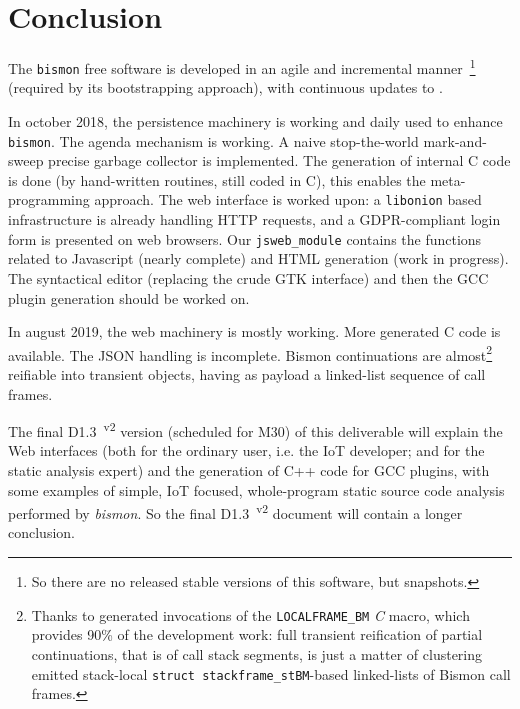 \section{Conclusion}
\label{sec:conclusion}

The \texttt{bismon} free software is developed in an agile and
incremental manner~\footnote{So there are no released stable versions
  of this software, but snapshots.} (required by its bootstrapping
approach), with continuous updates to
.

In october 2018, the persistence machinery is working and daily used
to enhance \texttt{bismon}. The agenda mechanism is working. A naive
stop-the-world mark-and-sweep precise garbage collector is
implemented. The generation of internal C code is done (by
hand-written routines, still coded in C), this enables the
meta-programming approach. The web interface is worked upon: a
\texttt{libonion} based infrastructure is already handling HTTP
requests, and a GDPR-compliant login form is presented on web
browsers. Our \texttt{jsweb\_module} contains the functions related to
Javascript (nearly complete) and HTML generation (work in progress). The
syntactical editor (replacing the crude GTK interface) and then the
GCC plugin generation should be worked on.

In august 2019, the web machinery is mostly working. More generated C
code is available. The JSON handling is incomplete. Bismon
continuations   are almost\footnote{Thanks to generated invocations of
  the \texttt{LOCALFRAME\_BM}
   \emph{C} macro, which
  provides 90\% of the development work: full transient reification of
  partial continuations, that is of   call stack segments, is just a matter of clustering emitted
  stack-local 
  \texttt{struct stackframe\_stBM}-based linked-lists of Bismon call
  frames.}  reifiable into transient  objects, having as payload a linked-list sequence of
 call frames.

The final D1.3~\textsuperscript{v2} version (scheduled for M30) of
this deliverable will explain the Web interfaces (both for the
ordinary user, i.e. the IoT developer; and for the static analysis
expert) and the generation of C++ code for GCC plugins, with some
examples of simple, IoT focused, whole-program static source code
analysis performed by \emph{bismon}. So the final
D1.3~\textsuperscript{v2} document will contain a longer conclusion.

